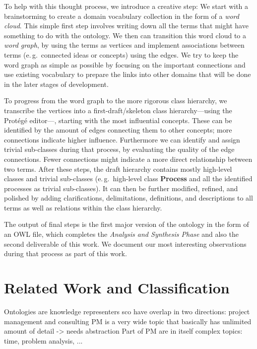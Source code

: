 \documentclass[a4paper, DIV=13, BCOR=0cm]{scrbook}
\newcommand{\eg}{e.\,g.\ }
\begin{document}
To help with this thought process, we introduce a creative step: We start with a brainstorming to create a domain vocabulary collection in the form of a \textit{word cloud}. This simple first step involves writing down all the terms that might have something to do with the ontology. We then can transition this word cloud to a \textit{word graph}, by using the terms as vertices and implement associations between terms (\eg connected ideas or concepts) using the edges. We try to keep the word graph as simple as possible by focusing on the important connections and use existing vocabulary to prepare the links into other domains that will be done in the later stages of development.

To progress from the word graph to the more rigorous class hierarchy, we transcribe the vertices into a first-draft/skeleton class hierarchy---using the Protégé editor---, starting with the most influential concepts. These can be identified by the amount of edges connecting them to other concepts; more connections indicate higher influence. Furthermore we can identify and assign trivial sub-classes during that process, by evaluating the quality of the edge connections. Fewer connections might indicate a more direct relationship between two terms. After these steps, the draft hierarchy contains mostly high-level classes and trivial sub-classes (\eg high-level class \textbf{Process} and all the identified processes as trivial sub-classes). It can then be further modified, refined, and polished by adding clarifications, delimitations, definitions, and descriptions to all terms as well as relations within the class hierarchy. 

The output of final steps is the first major version of the ontology in the form of an OWL file, which completes the \textit{Analysis and Synthesis Phase} and also the second deliverable of this work. We document our most interesting observations during that process as part of this work.

\section{Related Work and Classification}
\label{related-work}
Ontologies are knowledge representers
\gls{sco} have overlap in two directions: project management and consulting
PM is a very wide topic that basically has unlimited amount of detail -> needs abstraction
Part of PM are in itself complex topics: time, problem analysis, ...
\end{document}
